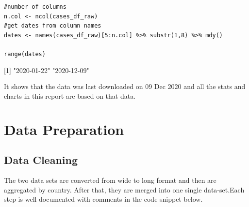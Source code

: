 \begin{verbatim}
#number of columns
n.col <- ncol(cases_df_raw)
#get dates from column names
dates <- names(cases_df_raw)[5:n.col] %>% substr(1,8) %>% mdy()

range(dates)
\end{verbatim}

[1] "2020-01-22" "2020-12-09"

It shows that the data was last downloaded on 09 Dec 2020 and all the stats and charts in this report are
based on that data.

\section{Data Preparation}
\subsection{Data Cleaning}

The two data sets are converted from wide to long format and then are aggregated by country. After that,
they are merged into one single data-set.Each step is well documented with comments in the code snippet below.


